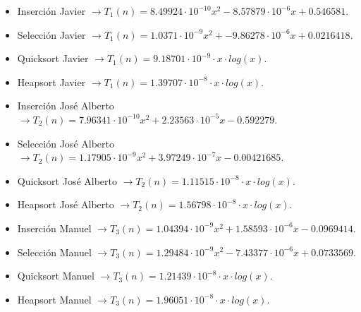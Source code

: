 \documentclass[10pt,a4paper]{article}
\begin{document}
\begin{itemize}
	\item Inserción Javier \(\rightarrow T_1(n) = 8.49924 \cdot 10^{-10} x^2 - 8.57879 \cdot 10^{-6} x + 0.546581\).
	\item Selección Javier \(\rightarrow T_1(n) = 1.0371 \cdot 10^{-9} x^2 + -9.86278 \cdot 10^{-6} x +0.0216418\).
	\item Quicksort Javier \(\rightarrow T_1(n) = 9.18701 \cdot 10^{-9} \cdot x \cdot log(x)\).
	\item Heapsort Javier \(\rightarrow T_1(n) = 1.39707 \cdot 10^{-8} \cdot x \cdot log(x)\).
\end{itemize}

\begin{itemize}
	\item Inserción José Alberto \(\rightarrow T_2(n) = 7.96341 \cdot 10^{-10} x^2 + 2.23563 \cdot 10^{-5} x - 0.592279\).
	\item Selección José Alberto \(\rightarrow T_2(n) = 1.17905 \cdot 10^{-9} x^2 + 3.97249 \cdot 10^{-7} x - 0.00421685\).
	\item Quicksort José Alberto \(\rightarrow T_2(n) = 1.11515 \cdot 10^{-8} \cdot x \cdot log(x)\).
	\item Heapsort José Alberto \(\rightarrow T_2(n) = 1.56798 \cdot 10^{-8} \cdot x \cdot log(x)\).
\end{itemize}

\begin{itemize}
	\item Inserción Manuel \(\rightarrow T_3(n) = 1.04394 \cdot 10^{-9} x^2 + 1.58593 \cdot 10^{-6} x - 0.0969414\).
	\item Selección Manuel \(\rightarrow T_3(n) = 1.29484 \cdot 10^{-9} x^2 - 7.43377 \cdot 10^{-6} x + 0.0733569\).
	\item Quicksort Manuel \(\rightarrow T_3(n) = 1.21439 \cdot 10^{-8} \cdot x \cdot log(x)\).
	\item Heapsort Manuel \(\rightarrow T_3(n) = 1.96051 \cdot 10^{-8} \cdot x \cdot log(x)\).
\end{itemize}
\end{document}
